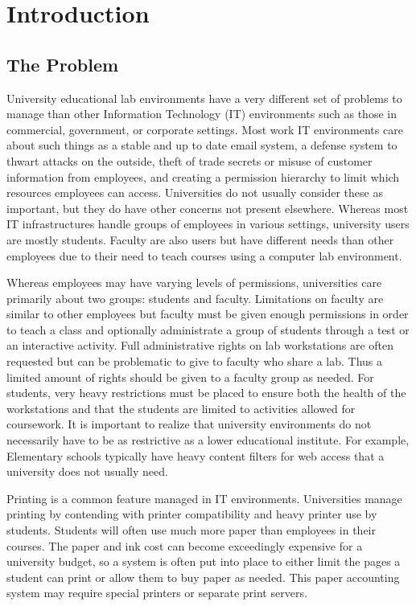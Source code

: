 \chapter{Introduction} \label{ch:introduction}
\section{The Problem} \label{sec:the_problem}
University educational lab environments have a very different set of problems to manage than other Information Technology (IT) environments such as those in commercial, government, or corporate settings.  Most work IT environments care about such things as a stable and up to date email system, a defense system to thwart attacks on the outside, theft of trade secrets or misuse of customer information from employees, and creating a permission hierarchy to limit which resources employees can access.  Universities do not usually consider these as important, but they do have other concerns not present elsewhere.  Whereas most IT infrastructures handle groups of employees in various settings, university users are mostly students.  Faculty are also users but have different needs than other employees due to their need to teach courses using a computer lab environment.  

Whereas employees may have varying levels of permissions, universities care primarily about two groups:  students and faculty.  Limitations on faculty are similar to other employees but faculty must be given enough permissions in order to teach a class and optionally administrate a group of students through a test or an interactive activity.  Full administrative rights on lab workstations are often requested but can be problematic to give to faculty who share a lab.  Thus a limited amount of rights should be given to a faculty group as needed.  For students, very heavy restrictions must be placed to ensure both the health of the workstations and that the students are limited to activities allowed for coursework.  It is important to realize that university environments do not necessarily have to be as restrictive as a lower educational institute.  For example, Elementary schools typically have heavy content filters for web access that a university does not usually need.

Printing is a common feature managed in IT environments.  Universities manage printing by contending with printer compatibility and heavy printer use by students.  Students will often use much more paper than employees in their courses.  The paper and ink cost can become exceedingly expensive for a university budget, so a system is often put into place to either limit the pages a student can print or allow them to buy paper as needed.  This paper accounting system may require special printers or separate print servers.  

